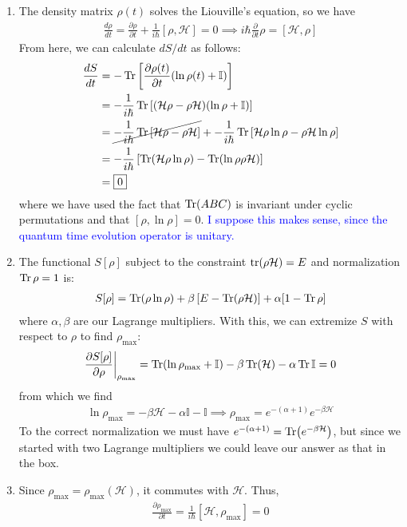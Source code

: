 \documentclass{article}
\theoremstyle{definition}
\newcommand{\p}{\partial}
\newcommand{\ham}{\mathcal{H}}
\newcommand{\al}{\alpha}
\newcommand{\be}{\beta}
\newcommand{\f}[2]{\frac{#1}{#2}}
\newcommand{\lb}{\left[}
\newcommand{\rb}{\right]}
\begin{document}
\begin{enumerate}[label=(\alph*)]
	\item The density matrix $\rho(t)$ solves the Liouville's equation, so we have
	\begin{align*}
	\f{d\rho }{dt} = \f{\p \rho}{\p t} + \f{1}{i\hbar} [\rho, \ham] = 0 \implies \boxed{i\hbar \f{\p}{\p t}\rho = [\ham,\rho]}
	\end{align*}
	From here, we can calculate $dS/dt$ as follows:
	\begin{align*}
	\f{dS}{dt} &= -\Tr \lb \f{\p \rho(t)}{\p t}(\ln \rho(t) + \mathbb{I} ) \rb \\
	&= -\f{1}{i\hbar}\Tr\lb (\ham \rho  - \rho \ham)(\ln \rho + \mathbb{I})  \rb\\
	&= \cancel{-\f{1}{i\hbar}\Tr\lb \ham \rho - \rho \ham \rb} + -\f{1}{i\hbar}\Tr\lb \ham \rho \ln \rho - \rho \ham \ln \rho \rb\\
	&= -\f{1}{i\hbar}\lb \Tr(\ham \rho \ln \rho)- \Tr(\ln \rho \rho \ham)  \rb\\
	&= \boxed{0}
	\end{align*}
	where we have used the fact that $\Tr(ABC)$ is invariant under cyclic permutations and that $[\rho,\ln \rho]  = 0$. \textcolor{blue}{I suppose this makes sense, since the quantum time evolution operator is unitary.}
	
	
	\item The functional $S[\rho]$ subject to the constraint $\tr(\rho \ham) = E$ and normalization $\Tr \rho = 1$ is:  
	\begin{align*}
	S[\rho] = \Tr(\rho \ln \rho)  + \be\lb E - \Tr(\rho \ham) \rb + \al[1 - \Tr\rho]
	\end{align*}
	where $\al,\be$ are our Lagrange multipliers. With this, we can extremize $S$ with respect to $\rho$ to find $\rho_\text{max}$:
	\begin{align*}
	\f{\p S[\rho]}{\p \rho}\bigg\vert_{\rho_\text{max}} = \Tr(\ln \rho_\text{max} + \mathbb{I}) - \be \Tr(\ham) -\al \Tr\mathbb{I} = 0
	\end{align*}
	from which we find 
	\begin{align*}
	\ln \rho_\text{max} = -\be\ham - \al\mathbb{I} - \mathbb{I} \implies \boxed{\rho_\text{max} = e^{-(\al + 1)}e^{-\be\ham}} 
	\end{align*}
	To the correct normalization we must have $e^{-(\al + 1)} = \Tr(e^{-\be \ham}) $, but since we started with two Lagrange multipliers we could leave our answer as that in the box. 
	
	
	
	\item Since $\rho_\text{max} = \rho_\text{max}(\ham)$, it commutes with $\ham$. Thus,
	\begin{align*}
	\f{\p \rho_\text{max}}{\p t} = \f{1}{i\hbar} [\ham, \rho_\text{max}] = \boxed{0}
	\end{align*} 
	
	
	
\end{enumerate}
\end{document}
